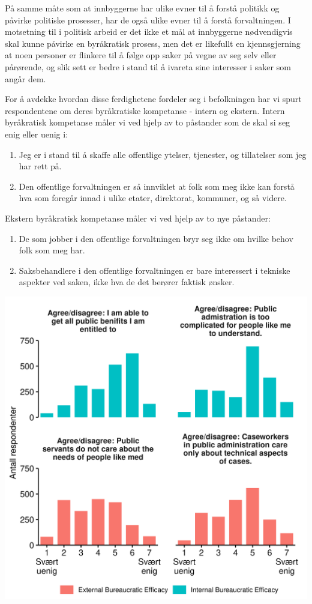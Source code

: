 \documentclass[
]{book}
\begin{document}
På samme måte som at innbyggerne har ulike evner til å forstå politikk og påvirke politiske prosesser, har de også ulike evner til å forstå forvaltningen.
I motsetning til i politisk arbeid er det ikke et mål at innbyggerne nødvendigvis skal kunne påvirke en byråkratisk prosess, men det er likefullt en kjennsgjerning at noen personer er flinkere til å følge opp saker på vegne av seg selv eller pårørende, og slik sett er bedre i stand til å ivareta sine interesser i saker som angår dem.

For å avdekke hvordan disse ferdighetene fordeler seg i befolkningen har vi spurt respondentene om deres byråkratiske kompetanse - intern og ekstern.
Intern byråkratisk kompetanse måler vi ved hjelp av to påstander som de skal si seg enig eller uenig i:

\begin{enumerate}
\def\labelenumi{\arabic{enumi}.}
\item
  Jeg er i stand til å skaffe alle offentlige ytelser, tjenester, og tillatelser som jeg har rett på.
\item
  Den offentlige forvaltningen er så innviklet at folk som meg ikke kan forstå hva som foregår innad i ulike etater, direktorat, kommuner, og så videre.
\end{enumerate}

Ekstern byråkratisk kompetanse måler vi ved hjelp av to nye påstander:

\begin{enumerate}
\def\labelenumi{\arabic{enumi}.}
\item
  De som jobber i den offentlige forvaltningen bryr seg ikke om hvilke behov folk som meg har.
\item
  Saksbehandlere i den offentlige forvaltningen er bare interessert i tekniske aspekter ved saken, ikke hva de det berører faktisk ønsker.
\end{enumerate}

\includegraphics{figs/png/fig_be_hist.png}
\end{document}
